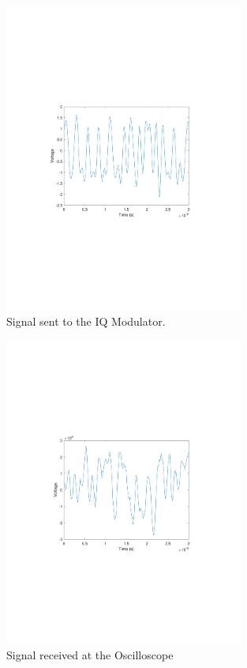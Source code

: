 \begin{refsection}
\begin{figure}[H]
	\centering
	\includegraphics[clip, trim=4cm 8cm 4cm 8cm, width=0.7\textwidth]{./sdf/m_qam_system/figures/exp/TX_03.pdf}
	\caption{Signal sent to the IQ Modulator.}
	\label{fig:qamTxSig}
\end{figure}

\begin{figure}[H]
\centering
\includegraphics[clip, trim=4cm 8cm 4cm 8cm, width=0.7\textwidth]{./sdf/m_qam_system/figures/exp/RX_03.pdf}
\caption{Signal received at the Oscilloscope}
\label{fig:qamRxSig}
\end{figure}


\end{refsection}
